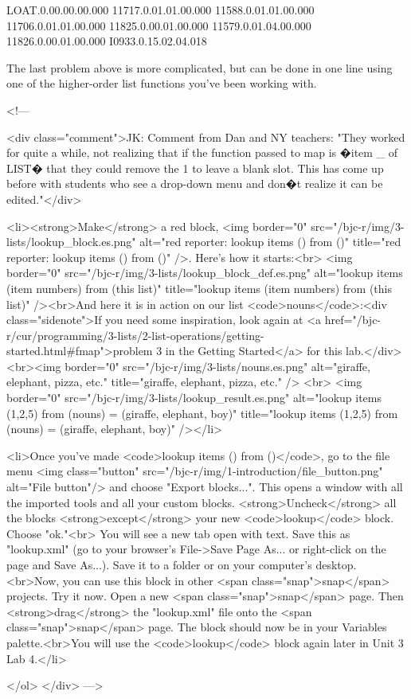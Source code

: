 LOAT.0.00.00.00.000
11717.0.01.01.00.000
11588.0.01.01.00.000
11706.0.01.01.00.000
11825.0.00.01.00.000
11579.0.01.04.00.000
11826.0.00.01.00.000
I0933.0.15.02.04.018




The last problem above is more complicated, but can be done in one line using one of the higher-order list functions you've been working with.





<!---

<div class="comment">JK: Comment from Dan and NY teachers: "They worked for quite a while, not realizing that if the function passed to map is �item _ of LIST� that they could remove the 1 to leave a blank slot.  This has come up before with students who see a drop-down menu and don�t realize it can be edited."</div>

        <li><strong>Make</strong> a red block, <img border="0" src="/bjc-r/img/3-lists/lookup_block.es.png" alt="red reporter: lookup items () from ()" title="red reporter: lookup items () from ()" />. Here's how it starts:<br> <img border="0" src="/bjc-r/img/3-lists/lookup_block_def.es.png" alt="lookup items (item numbers) from (this list)" title="lookup items (item numbers) from (this list)" /><br>And here it is in action on our list <code>nouns</code>:<div class="sidenote">If you need some inspiration, look again at <a href="/bjc-r/cur/programming/3-lists/2-list-operations/getting-started.html#fmap">problem 3 in the Getting Started</a> for this lab.</div><br><img border="0" src="/bjc-r/img/3-lists/nouns.es.png" alt="giraffe, elephant, pizza, etc." title="giraffe, elephant, pizza, etc." /> <br> <img border="0" src="/bjc-r/img/3-lists/lookup_result.es.png" alt="lookup items (1,2,5) from (nouns) = (giraffe, elephant, boy)" title="lookup items (1,2,5) from (nouns) = (giraffe, elephant, boy)" /></li>












        <li>Once you've made <code>lookup items () from ()</code>, go to the file menu <img class="button" src="/bjc-r/img/1-introduction/file_button.png" alt="File button"/> and choose "Export blocks...". This opens a window with all the imported tools and all your custom blocks. <strong>Uncheck</strong> all the blocks <strong>except</strong> your new <code>lookup</code> block. Choose "ok."<br> You will see a new tab open with text. Save this as "lookup.xml" (go to your browser's File->Save Page As... or right-click on the page and Save As...). Save it to a folder or on your computer's desktop.<br>Now, you can use this block in other <span class="snap">snap</span> projects. Try it now. Open a new <span class="snap">snap</span> page. Then <strong>drag</strong> the "lookup.xml" file onto the <span class="snap">snap</span> page. The block should now be in your Variables palette.<br>You will use the <code>lookup</code> block again later in Unit 3 Lab 4.</li>

    </ol>
    </div>
--->

